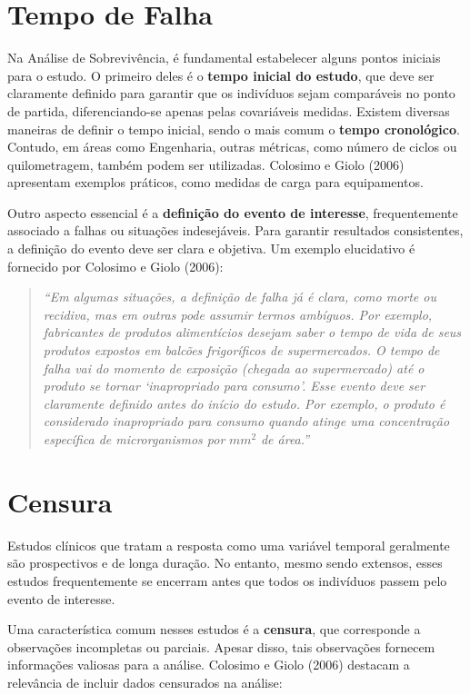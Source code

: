 \documentclass[
  12pt,
  letterpaper,
  DIV=11,
  numbers=noendperiod]{scrreprt}
\begin{document}
\section{Tempo de Falha}\label{tempo-de-falha}

Na Análise de Sobrevivência, é fundamental estabelecer alguns pontos
iniciais para o estudo. O primeiro deles é o \textbf{tempo inicial do
estudo}, que deve ser claramente definido para garantir que os
indivíduos sejam comparáveis no ponto de partida, diferenciando-se
apenas pelas covariáveis medidas. Existem diversas maneiras de definir o
tempo inicial, sendo o mais comum o \textbf{tempo cronológico}. Contudo,
em áreas como Engenharia, outras métricas, como número de ciclos ou
quilometragem, também podem ser utilizadas. Colosimo e Giolo (2006)
apresentam exemplos práticos, como medidas de carga para equipamentos.

Outro aspecto essencial é a \textbf{definição do evento de interesse},
frequentemente associado a falhas ou situações indesejáveis. Para
garantir resultados consistentes, a definição do evento deve ser clara e
objetiva. Um exemplo elucidativo é fornecido por Colosimo e Giolo
(2006):

\begin{quote}
\emph{``Em algumas situações, a definição de falha já é clara, como
morte ou recidiva, mas em outras pode assumir termos ambíguos. Por
exemplo, fabricantes de produtos alimentícios desejam saber o tempo de
vida de seus produtos expostos em balcões frigoríficos de supermercados.
O tempo de falha vai do momento de exposição (chegada ao supermercado)
até o produto se tornar `inapropriado para consumo'. Esse evento deve
ser claramente definido antes do início do estudo. Por exemplo, o
produto é considerado inapropriado para consumo quando atinge uma
concentração específica de microrganismos por} \(mm^{2}\) \emph{de
área.''}
\end{quote}

\section{Censura}\label{censura}

Estudos clínicos que tratam a resposta como uma variável temporal
geralmente são prospectivos e de longa duração. No entanto, mesmo sendo
extensos, esses estudos frequentemente se encerram antes que todos os
indivíduos passem pelo evento de interesse.

Uma característica comum nesses estudos é a \textbf{censura}, que
corresponde a observações incompletas ou parciais. Apesar disso, tais
observações fornecem informações valiosas para a análise. Colosimo e
Giolo (2006) destacam a relevância de incluir dados censurados na
análise:
\end{document}
